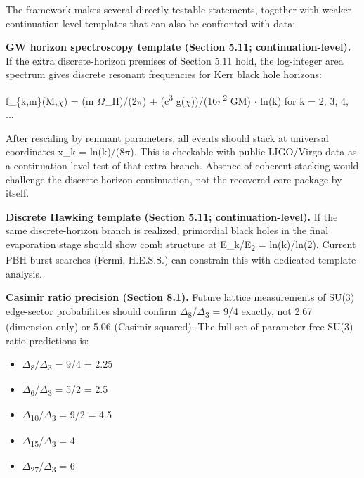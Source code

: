 The framework makes several directly testable statements, together with weaker continuation-level templates that can also be confronted with data:

\textbf{GW horizon spectroscopy template (Section 5.11; continuation-level).} If the extra discrete-horizon premises of Section 5.11 hold, the log-integer area spectrum gives discrete resonant frequencies for Kerr black hole horizons:

f\_\{k,m\}(M,\ensuremath{\chi}) = (m \ensuremath{\Omega}\_H)/(2\ensuremath{\pi}) + (c\textsuperscript{3} g(\ensuremath{\chi}))/(16\ensuremath{\pi}\textsuperscript{2} GM) \ensuremath{\cdot} ln(k) for k = 2, 3, 4, ...

After rescaling by remnant parameters, all events should stack at universal coordinates x\_k = ln(k)/(8\ensuremath{\pi}). This is checkable with public LIGO/Virgo data as a continuation-level test of that extra branch. Absence of coherent stacking would challenge the discrete-horizon continuation, not the recovered-core package by itself.

\textbf{Discrete Hawking template (Section 5.11; continuation-level).} If the same discrete-horizon branch is realized, primordial black holes in the final evaporation stage should show comb structure at E\_k/E\textsubscript{2} = ln(k)/ln(2). Current PBH burst searches (Fermi, H.E.S.S.) can constrain this with dedicated template analysis.

\textbf{Casimir ratio precision (Section 8.1).} Future lattice measurements of SU(3) edge-sector probabilities should confirm \ensuremath{\Delta}\textsubscript{8}/\ensuremath{\Delta}\textsubscript{3} = 9/4 exactly, not 2.67 (dimension-only) or 5.06 (Casimir-squared). The full set of parameter-free SU(3) ratio predictions is:

\begin{itemize}
\tightlist
\item
  \ensuremath{\Delta}\textsubscript{8}/\ensuremath{\Delta}\textsubscript{3} = 9/4 = 2.25
\item
  \ensuremath{\Delta}\textsubscript{6}/\ensuremath{\Delta}\textsubscript{3} = 5/2 = 2.5
\item
  \ensuremath{\Delta}\textsubscript{1}\textsubscript{0}/\ensuremath{\Delta}\textsubscript{3} = 9/2 = 4.5
\item
  \ensuremath{\Delta}\textsubscript{1}\textsubscript{5}/\ensuremath{\Delta}\textsubscript{3} = 4
\item
  \ensuremath{\Delta}\textsubscript{2}\textsubscript{7}/\ensuremath{\Delta}\textsubscript{3} = 6
\end{itemize}

